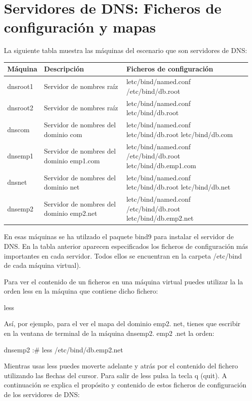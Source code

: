 \documentclass[12pt, a4paper]{report}
\begin{document}
\chapter{Servidores de DNS: Ficheros de configuración y mapas}
La siguiente tabla muestra las máquinas del escenario que son servidores de DNS:

\begin{center}
\begin{tabular}{|l|l|l|}
\hline
Máquina & Descripción & Ficheros de configuración \\
\hline\hline
dnsroot1 & Servidor de nombres raíz & letc/bind/named.conf /etc/bind/db.root \\
\hline
dnsroot2 & Servidor de nombres raíz & letc/bind/named.conf letc/bind/db.root \\
\hline
dnscom & Servidor de nombres del dominio com & letc/bind/named.conf letc/bind/db.root letc/bind/db.com \\
\hline
dnsemp1 & Servidor de nombres del dominio emp1.com & letc/bind/named.conf /etc/bind/db.root letc/bind/db.emp1.com \\
\hline
dnsnet & Servidor de nombres del dominio net & letc/bind/named.conf letc/bind/db.root letc/bind/db.net \\
\hline
dnsemp2 & Servidor de nombres del dominio emp2.net & letc/bind/named.conf /etc/bind/db.root letc/bind/db.emp2.net \\
\hline
\end{tabular}
\end{center}

En esas máquinas se ha utilzado el paquete bind9 para instalar el servidor de DNS. En la tabla anterior aparecen especificados los ficheros de configuración más importantes en cada servidor. Todos ellos se encuentran en la carpeta /etc/bind de cada máquina virtual).

Para ver el contenido de un ficheros en una máquina virtual puedes utilizar la la orden less en la máquina que contiene dicho fichero:

less 

Así, por ejemplo, para el ver el mapa del dominio emp2. net, tienes que escribir en la ventana de terminal de la máquina dnsemp2. emp2 .net la orden:

dnsemp2 :\# less /etc/bind/db.emp2.net

Mientras usas less puedes moverte adelante y atrás por el contenido del fichero utilizando las flechas del cursor. Para salir de less pulsa la tecla q (quit). A continuación se explica el propósito y contenido de estos ficheros de configuración de los servidores de DNS:
\end{document}
